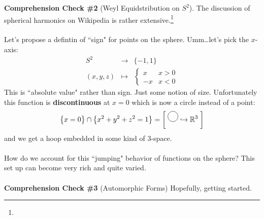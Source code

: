 \documentclass[12pt]{article}
\begin{document}
\noindent \textbf{Comprehension Check \#2} (Weyl Equidstribution on $S^2$). The discussion of spherical harmonics on Wikipedia is rather extensive.\footnote{}\\ \\
Let's propose a defintin of ``sign" for points on the sphere.  Umm\dots let's pick the $x$-axis:
\begin{eqnarray*}
S^2 &\to& \{ -1, 1 \} \\
(x,y,z) & \mapsto &  
\left\{ 
\begin{array}{rc} x & x > 0 \\ -x & x < 0 \end{array} 
\right.
\end{eqnarray*}
This is ``absolute value" rather than sign.  Just some notion of size. Unfortunately this function is \textbf{discontinuous} at $x = 0$ which is now a circle instead of a point:
$$  \big\{  x = 0 \big\}  \cap \big\{ x^2 + y^2 + z^2 = 1\big\} = \left[ \;
\begin{tikz} \draw (0,0) circle (0.25); \end{tikz} \hookrightarrow \mathbb{R}^3 \;\right] $$
and we get a hoop embedded in some kind of 3-space.  \\ \\
How do we account for this ``jumping" behavior of functions on the sphere?  This set up can become very rich and quite varied. \\ \\  
\noindent \textbf{Comprehension Check \#3} (Automorphic Forms) Hopefully, getting started. 
\end{document}
